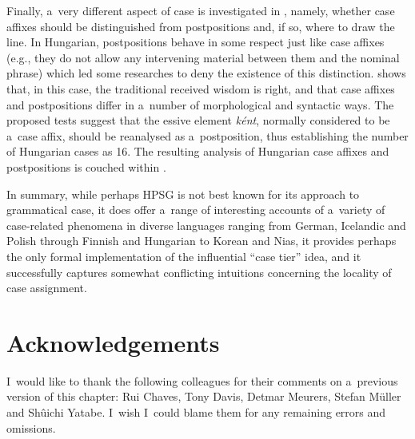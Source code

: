 \documentclass[output=paper]{langsci/langscibook}
\begin{document}
Finally, a~very different aspect of  case is investigated in \citealt{thui:11}, namely, whether case affixes should be distinguished from postpositions and, if so, where to draw the line.  In Hungarian, postpositions behave in some respect just like case affixes (e.g., they do not allow any intervening material between them and the nominal phrase) which led some researches to deny the existence of this distinction.  \citealt{thui:11} shows that, in this case, the traditional received wisdom is right, and that case affixes and postpositions differ in a~number of morphological and syntactic ways.  The proposed tests suggest that the essive element \emph{k{\'e}nt}, normally considered to be a~case affix, should be reanalysed as a~postposition, thus establishing the number of Hungarian cases as 16.  The resulting analysis of Hungarian case affixes and postpositions is couched within  \citep{BS2012a-ed}.

In summary, while perhaps HPSG is not best known for its approach to grammatical case, it does offer a~range of interesting accounts of a~variety of case-related phenomena in diverse languages ranging from German, Icelandic and Polish through Finnish and Hungarian to Korean and Nias, it provides perhaps the only formal implementation of the influential “case tier” idea, and it successfully captures somewhat conflicting intuitions concerning the locality of case assignment.


\section*{Acknowledgements}

I~would like to thank the following colleagues for their comments on a~previous version of this chapter: Rui Chaves, Tony Davis, Detmar Meurers, Stefan Müller and Shûichi Yatabe.  I~wish I~could blame them for any remaining errors and omissions.



{\sloppy 
\printbibliography[heading=subbibliography,notkeyword=this] 
}
\end{document}
